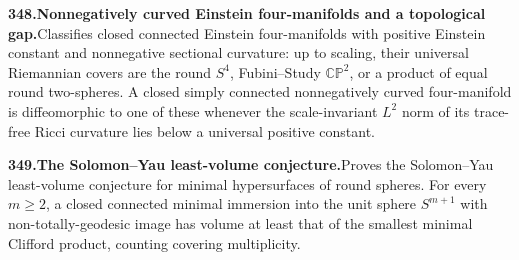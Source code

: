 \documentclass[11pt,a4paper]{article}
\begin{document}
  \par \begin{minipage}{\linewidth}
  \fontsize{10.5}{12.6}\selectfont\RaggedRight
  \hypertarget{result 348}{}
  {\bfseries\textcolor{muted}{348.}\enspace Nonnegatively curved Einstein four-manifolds and a topological gap.}\enspace Classifies closed connected Einstein four-manifolds with positive Einstein constant and nonnegative sectional curvature: up to scaling, their universal Riemannian covers are the round $S^4$, Fubini--Study $\mathbb{CP}^2$, or a product of equal round two-spheres. A closed simply connected nonnegatively curved four-manifold is diffeomorphic to one of these whenever the scale-invariant $L^2$ norm of its trace-free Ricci curvature lies below a universal positive constant.\par
  \end{minipage}\par\vspace{5pt}



  \par \begin{minipage}{\linewidth}
  \fontsize{10.5}{12.6}\selectfont\RaggedRight
  \hypertarget{result 349}{}
  {\bfseries\textcolor{muted}{349.}\enspace The Solomon--Yau least-volume conjecture.}\enspace Proves the Solomon--Yau least-volume conjecture for minimal hypersurfaces of round spheres. For every $m\ge2$, a closed connected minimal immersion into the unit sphere $S^{m+1}$ with non-totally-geodesic image has volume at least that of the smallest minimal Clifford product, counting covering multiplicity.\par
  \end{minipage}\par\vspace{5pt}
\end{document}
